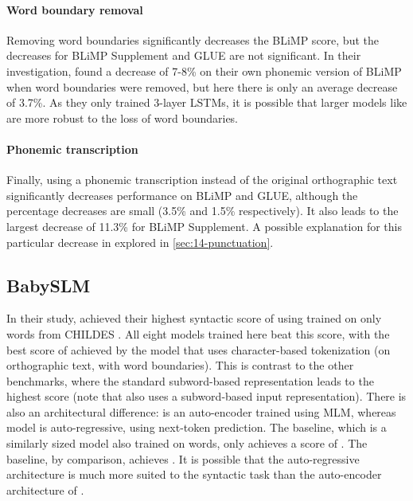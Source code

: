 \paragraph{Word boundary removal} Removing word boundaries significantly decreases the BLiMP score, but the decreases for BLiMP Supplement and GLUE are not significant. In their investigation, \citet{nguyen-2022-word-boundaries} found a decrease of 7-8\% on their own phonemic version of BLiMP when word boundaries were removed, but here there is only an average decrease of 3.7\%. As they only trained 3-layer LSTMs, it is possible that larger models like \gpt are more robust to the loss of word boundaries.

\paragraph{Phonemic transcription} Finally, using a phonemic transcription instead of the original orthographic text significantly decreases performance on BLiMP and GLUE, although the percentage decreases are small (3.5\% and 1.5\% respectively). It also leads to the largest decrease of 11.3\% for BLiMP Supplement. A possible explanation for this particular decrease in explored in \cref{sec:14-punctuation}.

\subsection{BabySLM}
\label{sec:14-babyslm}

In their study, \citet{lavechin} achieved their highest syntactic score of  using \babyberta \citep{huebner-etal-2021-babyberta} trained on only  words from CHILDES \citep{macwhinney1985child}. All eight \gpt models trained here beat this score, with the best score of  achieved by the model that uses character-based tokenization (on orthographic text, with word boundaries). This is contrast to the other benchmarks, where the standard subword-based representation leads to the highest score (note that \babyberta also uses a subword-based input representation). There is also an architectural difference: \babyberta is an auto-encoder trained using MLM, whereas \gpt model is auto-regressive, using next-token prediction. The  baseline, which is a similarly sized model also trained on  words, only achieves a score of . The  baseline, by comparison, achieves . It is possible that the auto-regressive architecture is much more suited to the syntactic task than the auto-encoder architecture of \bert. 

